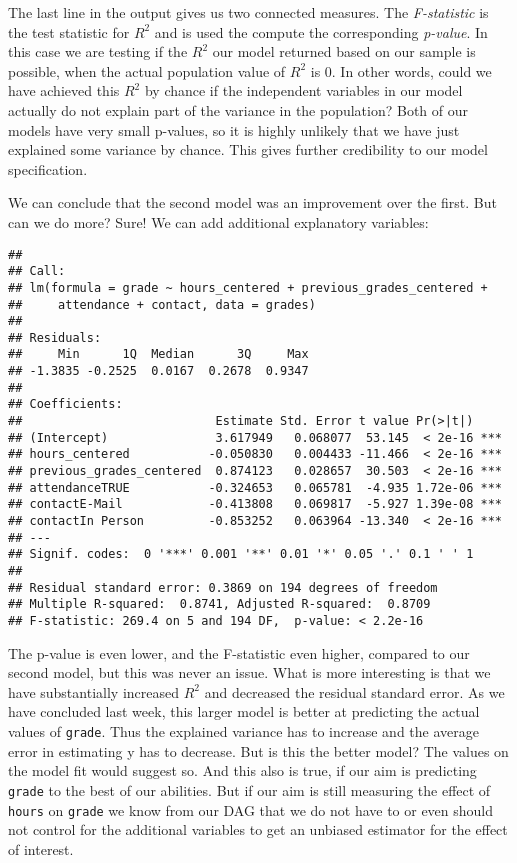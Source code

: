 \documentclass[
]{book}
\begin{document}
The last line in the output gives us two connected measures. The \emph{F-statistic}
is the test statistic for \(R^2\) and is used the compute the corresponding
\emph{p-value}.
In this case we are testing if the \(R^2\) our model returned based on our sample
is possible, when the actual population value of \(R^2\) is \(0\). In other words,
could we have achieved this \(R^2\) by chance if the independent variables in our
model actually do not explain part of the variance in the population?
Both of our models have very small p-values, so it is highly unlikely that we
have just explained some variance by chance. This gives further credibility to
our model specification.

We can conclude that the second model was an improvement over the first. But can
we do more? Sure! We can add additional explanatory variables:

\begin{verbatim}
## 
## Call:
## lm(formula = grade ~ hours_centered + previous_grades_centered + 
##     attendance + contact, data = grades)
## 
## Residuals:
##     Min      1Q  Median      3Q     Max 
## -1.3835 -0.2525  0.0167  0.2678  0.9347 
## 
## Coefficients:
##                           Estimate Std. Error t value Pr(>|t|)    
## (Intercept)               3.617949   0.068077  53.145  < 2e-16 ***
## hours_centered           -0.050830   0.004433 -11.466  < 2e-16 ***
## previous_grades_centered  0.874123   0.028657  30.503  < 2e-16 ***
## attendanceTRUE           -0.324653   0.065781  -4.935 1.72e-06 ***
## contactE-Mail            -0.413808   0.069817  -5.927 1.39e-08 ***
## contactIn Person         -0.853252   0.063964 -13.340  < 2e-16 ***
## ---
## Signif. codes:  0 '***' 0.001 '**' 0.01 '*' 0.05 '.' 0.1 ' ' 1
## 
## Residual standard error: 0.3869 on 194 degrees of freedom
## Multiple R-squared:  0.8741, Adjusted R-squared:  0.8709 
## F-statistic: 269.4 on 5 and 194 DF,  p-value: < 2.2e-16
\end{verbatim}

The p-value is even lower, and the F-statistic even higher, compared to our
second model, but this was never an issue. What is more interesting is that we
have substantially increased \(R^2\) and decreased the residual standard error.
As we have concluded last week, this larger model is better at predicting the
actual values of \texttt{grade}. Thus the explained variance has to increase and the
average error in estimating y has to decrease. But is this the better model? The
values on the model fit would suggest so. And this also is true, if our aim is
predicting \texttt{grade} to the best of our abilities. But if our aim is still
measuring the effect of \texttt{hours} on \texttt{grade} we know from our DAG that we do not
have to or even should not control for the additional variables to get an
unbiased estimator for the effect of interest.
\end{document}
